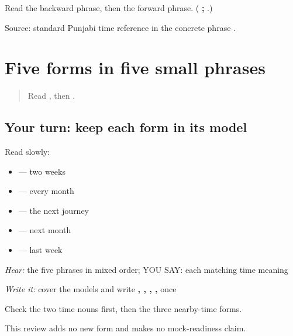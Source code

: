 \begin{tcolorbox}[breakable,colback=teal!4,colframe=teal!35!black,title={Before you move on}]
Read the backward phrase, then the forward phrase. (\textbf{ ;  }.)

Source: standard Punjabi time reference in the concrete phrase \textbf{ }.
\end{tcolorbox}
\section[\texorpdfstring{\pa{ਹਫ਼ਤੇ}, \pa{ਮਹੀਨੇ}, \pa{ਅਗਲੀ} … (hafte, mahiine …)}{ਹਫ਼ਤੇ, ਮਹੀਨੇ, ਅਗਲੀ … (hafte, mahiine …)}]{Five forms in five small phrases}

\label{lesson:PA-C184-time-review}



\begin{quote}
Read \textbf{ }, then \textbf{ }.
\end{quote}

\subsection*{Your turn: keep each form in its model}
Read slowly:

\begin{itemize}
\raggedright
  \item \textbf{ } — two weeks
  \item \textbf{ } — every month
  \item \textbf{ } — the next journey
  \item \textbf{ } — next month
  \item \textbf{ } — last week
\end{itemize}

\emph{Hear:} the five phrases in mixed order; YOU SAY: each matching time meaning

\begin{tcolorbox}[breakable,colback=teal!4,colframe=teal!35!black,title={Before you move on}]
\emph{Write it:} cover the models and write \textbf{, , , , } once

Check the two time nouns first, then the three nearby-time forms.

This review adds no new form and makes no mock-readiness claim.
\end{tcolorbox}

